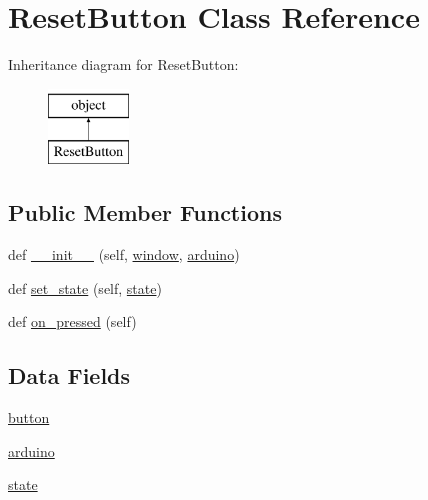\hypertarget{class_g_u_i_01_briefkasten_1_1_reset_button}{}\section{Reset\+Button Class Reference}
\label{class_g_u_i_01_briefkasten_1_1_reset_button}
Inheritance diagram for Reset\+Button\+:\begin{figure}[H]
\begin{center}
\leavevmode
\includegraphics[height=2.000000cm]{class_g_u_i_01_briefkasten_1_1_reset_button}
\end{center}
\end{figure}
\subsection*{Public Member Functions}
\begin{DoxyCompactItemize}
\item 
def \mbox{\hyperlink{class_g_u_i_01_briefkasten_1_1_reset_button_a5f57538485260d20a41382d14a50b673}{\+\_\+\+\_\+init\+\_\+\+\_\+}} (self, \mbox{\hyperlink{namespace_g_u_i_01_briefkasten_a04a8a2bbfa9c15500892b8e5033d625b}{window}}, \mbox{\hyperlink{class_g_u_i_01_briefkasten_1_1_reset_button_a3f424772edaa120b12bda2b9addc2bf5}{arduino}})
\item 
def \mbox{\hyperlink{class_g_u_i_01_briefkasten_1_1_reset_button_ac59e8384988979b4ab58599ebe9dfe5e}{set\+\_\+state}} (self, \mbox{\hyperlink{class_g_u_i_01_briefkasten_1_1_reset_button_adc6e5733fc3c22f0a7b2914188c49c90}{state}})
\item 
def \mbox{\hyperlink{class_g_u_i_01_briefkasten_1_1_reset_button_a96da8e992148f9643251b6502b55e80f}{on\+\_\+pressed}} (self)
\end{DoxyCompactItemize}
\subsection*{Data Fields}
\begin{DoxyCompactItemize}
\item 
\mbox{\hyperlink{class_g_u_i_01_briefkasten_1_1_reset_button_a14139799dd4b2fc41ecb6cb14936322f}{button}}
\item 
\mbox{\hyperlink{class_g_u_i_01_briefkasten_1_1_reset_button_a3f424772edaa120b12bda2b9addc2bf5}{arduino}}
\item 
\mbox{\hyperlink{class_g_u_i_01_briefkasten_1_1_reset_button_adc6e5733fc3c22f0a7b2914188c49c90}{state}}
\end{DoxyCompactItemize}


